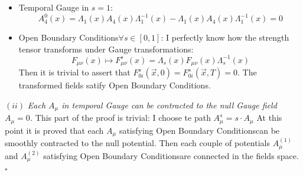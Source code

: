 \documentclass[english, LaM, oneside, noexaminfo]{sapthesis}
\newcommand{\obc}{Open Boundary Conditions}
\newcommand{\proved}{\newline \hspace*{.97\textwidth} $\square$}
\begin{document}
\begin{itemize}
    \item Temporal Gauge in $s=1$: $$A_4^0 (x) = \Lambda_1 (x) A_4 (x) \Lambda_1^{-1} (x) - \Lambda_1 (x) A_4 (x) \Lambda_1^{-1} (x) = 0$$
    \item \obc\space $\forall s \in [0,1]$: I perfectly know how the strength tensor transforms under Gauge transformations:
        $$F_{\mu\nu} (x) \mapsto F_{\mu\nu}^s (x) = \Lambda_s (x) F_{\mu\nu} (x) \Lambda_s^{-1} (x) $$
        Then it is trivial to assert that $F_{0i}^s (\vec x, 0) = F_{0i}^s (\vec x, T) = 0$.
        The transformed fields satify \obc.
\end{itemize}
$(ii)$ \textit{Each $A_\mu$ in temporal Gauge can be contracted to the null Gauge field $A_\mu = 0$.}
\newline
This part of the proof is trivial: I choose te path $A_\mu^s = s\cdot A_\mu$
\newline\newline
At this point it is proved that each $A_\mu$ satisfying \obc\space can be smoothly contracted to the null potential.
Then each couple of potentials $A_\mu^{(1)}$ and $A_\mu^{(2)}$ satisfying \obc\space are connected in the fields space.
\proved
\end{document}
